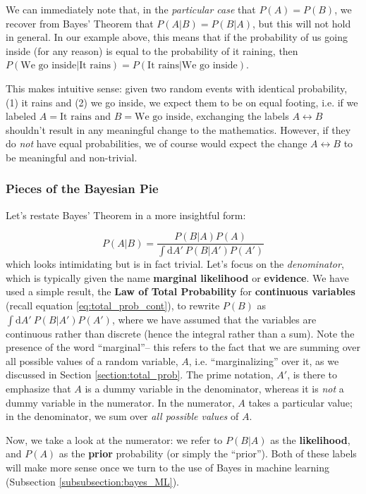 \documentclass[]{article}
\begin{document}
We can immediately note that, in the \textit{particular case} that $P(A)=P(B)$, we recover from Bayes' Theorem that $P(A|B) = P(B|A)$, but this will not hold in general. In our example above, this means that if the probability of us going inside (for any reason) is equal to the probability of it raining, then $P(\text{We go inside} | \text{It rains}) = P(\text{It rains}|\text{We go inside})$. 

This makes intuitive sense: given two random events with identical probability, (1) it rains and (2) we go inside, we expect them to be on equal footing, i.e. if we labeled $A=\text{It rains}$ and $B=\text{We go inside}$, exchanging the labels $A \leftrightarrow B$ shouldn't result in any meaningful change to the mathematics. However, if they do \textit{not} have equal probabilities, we of course would expect the change $A \leftrightarrow B$ to be meaningful and non-trivial.

\subsubsection{Pieces of the Bayesian Pie}

Let's restate Bayes' Theorem in a more insightful form:

\begin{equation}
    P(A|B) = \frac{P(B|A)P(A)}{\int \text{d}A'~P(B|A')P(A')}
\end{equation}
which looks intimidating but is in fact trivial. Let's focus on the \textit{denominator}, which is typically given the name \textbf{marginal likelihood} or \textbf{evidence}. We have used a simple result, the \textbf{Law of Total Probability} for \textbf{continuous variables} (recall equation \ref{eq:total_prob_cont}), to rewrite $P(B)$ as $\int \text{d}A'~P(B|A')P(A')$, where we have assumed that the variables are continuous rather than discrete (hence the integral rather than a sum). Note the presence of the word ``marginal''-- this refers to the fact that we are summing over all possible values of a random variable, $A$, i.e. ``marginalizing'' over it, as we discussed in Section \ref{section:total_prob}. The prime notation, $A'$, is there to emphasize that $A$ is a dummy variable in the denominator, whereas it is \textit{not} a dummy variable in the numerator. In the numerator, $A$ takes a particular value; in the denominator, we sum over \textit{all possible values} of $A$.

Now, we take a look at the numerator: we refer to $P(B|A)$ as the \textbf{likelihood}, and $P(A)$ as the \textbf{prior} probability (or simply the ``prior''). Both of these labels will make more sense once we turn to the use of Bayes in machine learning (Subsection \ref{subsubsection:bayes_ML}).
\end{document}
